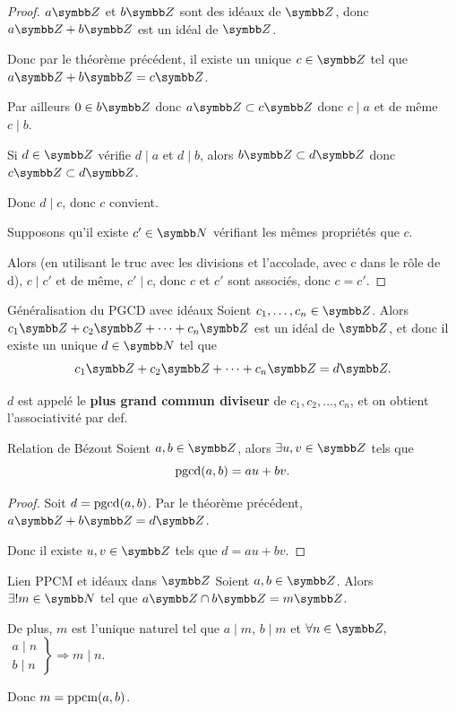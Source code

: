 \begin{proof}
    $a \Z$ et $b \Z$ sont des idéaux de $\Z$, donc $a \Z + b \Z$ est un idéal de $\Z$.

    Donc par le théorème précédent, il existe un unique $c \in \Z$ tel que $a \Z + b \Z = c \Z$.

    Par ailleurs $0 \in b \Z$ donc $a \Z \subset c \Z$ donc $c \mid a $ et de même $c \mid b$.

    Si $d \in \Z$ vérifie $d \mid a$ et $d \mid b$, alors $b \Z \subset d \Z$ donc $c \Z \subset d \Z$. 

    Donc $d \mid c$, donc $c $ convient. 

    \svspace Supposons qu'il existe $c' \in \N$ vérifiant les mêmes propriétés que $c$. 

    Alors (en utilisant le truc avec les divisions et l'accolade, avec c dans le rôle de d), 
    $c \mid c'$ et de même, $c' \mid c$, donc $c$ et $c'$ sont associés, donc $c = c'$.
\end{proof}


\begin{proposition}{Généralisation du PGCD avec idéaux}{}
    Soient $c_1, \ldots, c_n \in \Z$. Alors $c_1 \Z + c_2 \Z + \cdots + c_n \Z$ est un 
    idéal de $\Z$, et donc il existe un unique $d \in \N$ tel que 
    \[
        c_1 \Z + c_2 \Z + \cdots + c_n \Z = d \Z.
    \]

    $d$ est appelé le \textbf{plus grand commun diviseur} de $c_1, c_2, \ldots, c_n$, et 
    on obtient l'associativité par def. 
\end{proposition}

\begin{proposition}{Relation de Bézout}{}
    Soient $a, b \in \Z$, alors $\exists u, v \in \Z$ tels que 
    \[
        \operatorname{pgcd}(a, b) = au + bv.
    \]
\end{proposition}

\begin{proof}
    Soit $d = \operatorname{pgcd}(a, b)$. Par le théorème précédent, $a \Z + b \Z = d \Z$.

    Donc il existe $u, v \in \Z$ tels que $d = au + bv$.
\end{proof}

\begin{theoreme}{Lien PPCM et idéaux dans $\Z$}{}
    Soient $a, b \in \Z$. Alors $\exists ! m \in \N$ tel que $a \Z \cap b \Z = m \Z$.

    De plus, $m$ est l'unique naturel tel que $a \mid m$, $b \mid m$ et 
    $\forall n \in \Z,$
    $\left. \begin{aligned}
        a \mid n \\
        b \mid n    
    \end{aligned} \right\} \Rightarrow m \mid n$.

    Donc $m = \operatorname{ppcm}(a, b)$.
\end{theoreme}

